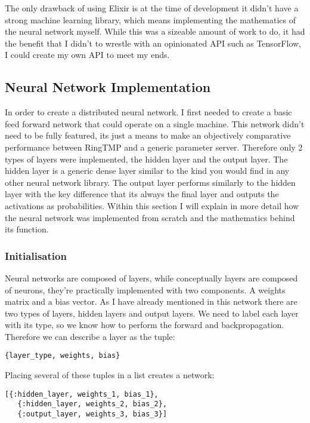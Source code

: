 The only drawback of using Elixir is at the time of development it didn't have a
strong machine learning library, which means implementing the mathematics of the
neural network myself. While this was a sizeable amount of work to do, it had
the benefit that I didn't to wrestle with an opinionated API such as TensorFlow,
I could create my own API to meet my ends.

\subsection{Neural Network Implementation}
In order to create a distributed neural network. I first needed to create a
basic feed forward network that could operate on a single machine. This network
didn't need to be fully featured, its just a means to make an objectively
comparative performance between RingTMP and a generic parameter server.
Therefore only 2 types of layers were implemented, the hidden layer and the
output layer. The hidden layer is a generic dense layer similar to the kind you
would find in any other neural network library. The output layer performs
similarly to the hidden layer with the key difference that its always the final
layer and outputs the activations as probabilities. Within this section I will
explain in more detail how the neural network was implemented from scratch and
the mathematics behind its function.

\subsubsection{Initialisation}
Neural networks are composed of layers, while conceptually layers are
composed of neurons, they're practically implemented with two components. A
weights matrix and a bias vector. As I have already mentioned in this network
there are two types of layers, hidden layers and output layers. We need to label
each layer with its type, so we know how to perform the forward and
backpropagation. Therefore we can describe a layer as the tuple:
\begin{lstlisting}[numbers=none,frame=none]
    {layer_type, weights, bias}
\end{lstlisting}

Placing several of these tuples in a list creates a network:
\begin{lstlisting}[numbers=none,frame=none]
  [{:hidden_layer, weights_1, bias_1},
   {:hidden_layer, weights_2, bias_2},
   {:output_layer, weights_3, bias_3}]
\end{lstlisting}

